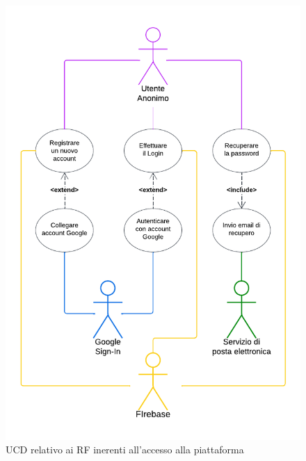 \documentclass[11pt, a4paper]{article}
\theoremstyle{definition} %
\begin{document}
\begin{figure}[H]
\centering
\includegraphics[scale=0.63]{materiale/ucdiagrams/ucaccesso.pdf}
\caption{UCD relativo ai RF inerenti all'accesso alla piattaforma}
\label{access}
\end{figure}
\end{document}
